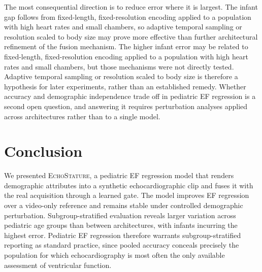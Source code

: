 \documentclass{ws-procs11x85}
\begin{document}
The most consequential direction is to reduce error where it is largest.
{\color{blue}The infant gap follows from fixed-length, fixed-resolution encoding applied to a population with high heart rates and small chambers, so adaptive temporal sampling or resolution scaled to body size may prove more effective than further architectural refinement of the fusion mechanism.}
{\color{red}The higher infant error may be related to fixed-length, fixed-resolution encoding applied to a population with high heart rates and small chambers, but those mechanisms were not directly tested. Adaptive temporal sampling or resolution scaled to body size is therefore a hypothesis for later experiments, rather than an established remedy.}
Whether accuracy and demographic independence trade off in pediatric EF regression is a second open question, and answering it requires perturbation analyses applied across architectures rather than to a single model.


\section{Conclusion}

We presented \textsc{EchoStature}, a pediatric EF regression model that renders demographic attributes into a synthetic echocardiographic clip and fuses it with the real acquisition through a learned gate.
The model improves EF regression over a video-only reference and remains stable under controlled demographic perturbation.
Subgroup-stratified evaluation reveals larger variation across pediatric age groups than between architectures, with infants incurring the highest error.
Pediatric EF regression therefore warrants subgroup-stratified reporting as standard practice, since pooled accuracy conceals precisely the population for which echocardiography is most often the only available assessment of ventricular function.
\newpage


\end{document}
